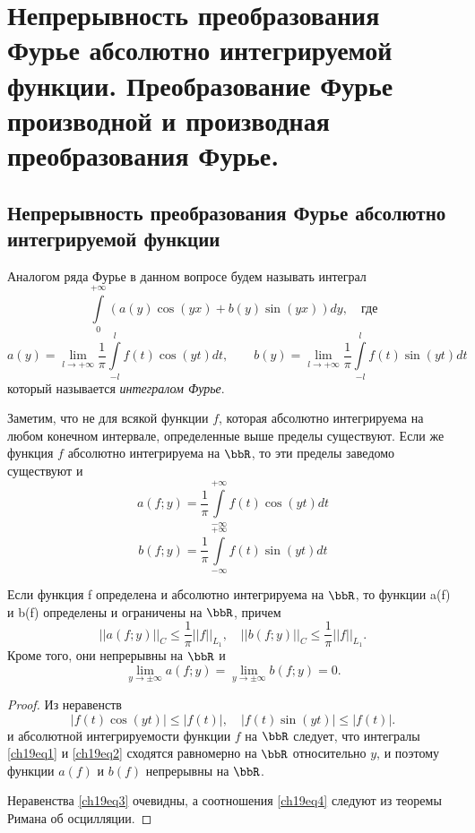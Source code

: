 \chapter{Непрерывность преобразования Фурье абсолютно интегрируемой функции. Преобразование Фурье производной и производная преобразования Фурье.}
\section{Непрерывность преобразования Фурье абсолютно интегрируемой функции}

Аналогом ряда Фурье в данном вопросе будем называть интеграл
$$
\int\limits_{0}^{+\infty} (a(y)\cos(yx) + b(y)\sin(yx))dy,\quad \text{где}
$$
$$
a(y) = \lim_{l \to +\infty}\frac{1}{\pi}\int\limits_{-l}^{l} f(t)\cos(yt)dt,\qquad 
b(y) = \lim_{l \to +\infty}\frac{1}{\pi}\int\limits_{-l}^{l} f(t)\sin(yt)dt
$$
который называется \textit{интегралом Фурье}.

Заметим, что не для всякой функции $f$, которая абсолютно интегрируема на любом конечном интервале, определенные выше пределы существуют. Если же функция $f$ абсолютно интегрируема на $\bbR$, то эти пределы заведомо существуют и
\begin{equation} \label{ch19eq1}
a(f;y) = \frac{1}{\pi}\int\limits_{-\infty}^{+\infty} f(t)\cos(yt)dt
\end{equation}
\begin{equation} \label{ch19eq2}
b(f;y) = \frac{1}{\pi}\int\limits_{-\infty}^{+\infty} f(t)\sin(yt)dt
\end{equation}

\begin{thm}
Если функция f определена и абсолютно интегрируема на $\bbR$, то функции a(f) и b(f) определены и ограничены на $\bbR$, причем
\begin{equation} \label{ch19eq3}
||a(f;y)||_C \le \frac{1}{\pi}||f||_{L_{1}}, \quad ||b(f;y)||_C \le \frac{1}{\pi}||f||_{L_{1}}.
\end{equation}
Кроме того, они непрерывны на $\bbR$ и
\begin{equation} \label{ch19eq4}
\lim_{y \to \pm\infty} a(f;y) = \lim_{y \to \pm\infty} b(f;y) = 0.
\end{equation}
\end{thm}
\begin{proof}
Из неравенств
$$
|f(t)\cos(yt)| \le |f(t)|, \quad |f(t)\sin(yt)| \le |f(t)|.
$$
и абсолютной интегрируемости функции $f$ на $\bbR$ следует, что интегралы \eqref{ch19eq1} и \eqref{ch19eq2} сходятся равномерно на $\bbR$ относительно $y$, и поэтому функции $a(f)$ и $b(f)$ непрерывны на $\bbR$.

Неравенства \eqref{ch19eq3} очевидны, а соотношения \eqref{ch19eq4} следуют из теоремы Римана об осцилляции. 
\end{proof}

